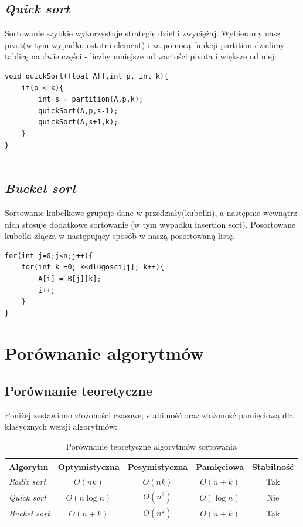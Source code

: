 \documentclass{article}
\begin{document}
	\subsection{\textit{Quick sort}}
	Sortowanie szybkie wykorzystuje strategię dziel i zwyciężaj. Wybieramy nasz pivot(w tym wypadku ostatni element) i za pomocą funkcji partition dzielimy tablicę na dwie części - liczby mniejsze od wartości pivota i większe od niej:
	\begin{lstlisting}
void quickSort(float A[],int p, int k){
	if(p < k){
		int s = partition(A,p,k);
		quickSort(A,p,s-1);
		quickSort(A,s+1,k);
	}
}
		
	\end{lstlisting}
	
	\subsection{\textit{Bucket sort}}
	Sortowanie kubełkowe grupuje dane w przedziały(kubełki), a następnie wewnątrz nich stosuje dodatkowe sortowanie (w tym wypadku insertion sort). Posortowane kubełki złącza w następujący sposób w naszą posortowaną listę.
	\begin{lstlisting}
for(int j=0;j<n;j++){
	for(int k =0; k<dlugosci[j]; k++){
		A[i] = B[j][k];
		i++;
	}
}
	\end{lstlisting}
	
	\section{Porównanie algorytmów}
	
	\subsection{Porównanie teoretyczne}
	Poniżej zestawiono złożoności czasowe, stabilność oraz złożoność pamięciową dla klasycznych wersji algorytmów:
	\begin{table}[H]
		\begin{tabular}{|l|c|c|c|c|}
			\hline
			\textbf{Algorytm}       & \textbf{Optymistyczna} & \textbf{Pesymistyczna}  & \textbf{Pamięciowa} & \textbf{Stabilność} \\ \hline
			\textit{Radix sort}     & $O(nk)$                & $O(nk)$                & $O(n + k)$          & Tak                 \\ \hline
			\textit{Quick sort}     & $O(n \log n)$          & $O(n^2)$               & $O(\log n)$         & Nie                 \\ \hline
			\textit{Bucket sort}    & $O(n + k)$            & $O(n^2)$               & $O(n + k)$          & Tak                 \\ \hline
		\end{tabular}
		\caption{Porównanie teoretyczne algorytmów sortowania}
	\end{table}
	
\end{document}
